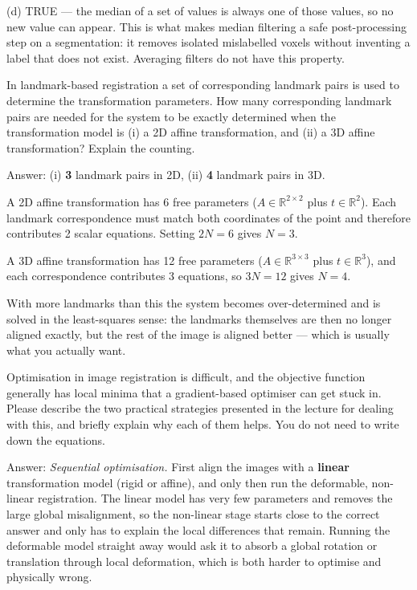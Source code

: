 \documentclass[11pt]{exam}
\newcommand{\answerspace}[1]{\ifprintanswers\else\vspace{#1}\fi}
\begin{document}
\begin{questions}
\begin{solution}
  (d) TRUE --- the median of a set of values is always one of those values, so no new value can
  appear. This is what makes median filtering a safe post-processing step on a segmentation: it
  removes isolated mislabelled voxels without inventing a label that does not exist. Averaging
  filters do not have this property.
\end{solution}

\question
In landmark-based registration a set of corresponding landmark pairs is used to determine the
transformation parameters. How many corresponding landmark pairs are needed for the system to be
exactly determined when the transformation model is (i) a 2D affine transformation, and (ii) a 3D
affine transformation? Explain the counting.

\begin{solution}
  Answer: (i) \textbf{3} landmark pairs in 2D, (ii) \textbf{4} landmark pairs in 3D.

  A 2D affine transformation has 6 free parameters ($A \in \mathbb{R}^{2\times2}$ plus
  $t \in \mathbb{R}^2$). Each landmark correspondence must match both coordinates of the point and
  therefore contributes 2 scalar equations. Setting $2N = 6$ gives $N = 3$.

  A 3D affine transformation has 12 free parameters ($A \in \mathbb{R}^{3\times3}$ plus
  $t \in \mathbb{R}^3$), and each correspondence contributes 3 equations, so $3N = 12$ gives
  $N = 4$.

  With more landmarks than this the system becomes over-determined and is solved in the
  least-squares sense: the landmarks themselves are then no longer aligned exactly, but the rest of
  the image is aligned better --- which is usually what you actually want.
\end{solution}
\answerspace{4.0cm}

\question
Optimisation in image registration is difficult, and the objective function generally has local
minima that a gradient-based optimiser can get stuck in. Please describe the two practical
strategies presented in the lecture for dealing with this, and briefly explain why each of them
helps. You do not need to write down the equations.

\begin{solution}
  Answer: \emph{Sequential optimisation.} First align the images with a \textbf{linear}
  transformation model (rigid or affine), and only then run the deformable, non-linear
  registration. The linear model has very few parameters and removes the large global
  misalignment, so the non-linear stage starts close to the correct answer and only has to
  explain the local differences that remain. Running the deformable model straight away would ask
  it to absorb a global rotation or translation through local deformation, which is both harder to
  optimise and physically wrong.


\end{solution}
\end{questions}
\end{document}
